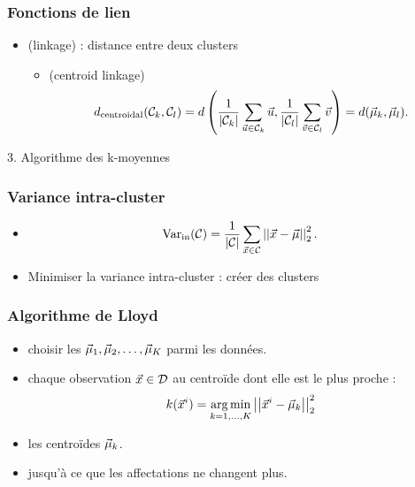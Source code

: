 \begin{frame}[t]
  \frametitle{Fonctions de lien}
  \begin{itemize}
  \item {} \textcolor{gray!70}{(linkage)} : distance entre deux clusters
    \begin{itemize}
    \item {} \textcolor{gray!70}{(centroid linkage)}
      \[
        d_{\text{centroidal}}(\mathcal{C}_k, \mathcal{C}_l) = d \left (\frac1{\lvert \mathcal{C}_k \rvert} 
          \sum_{\vec{u} \in \mathcal{C}_k} \vec{u}, 
          \frac1{\lvert \mathcal{C}_l \rvert} \sum_{\vec{v} \in \mathcal{C}_l} \vec{v} \right) = 
        d(\vec{\mu}_k, \vec{\mu}_l).
      \]
    \end{itemize}
  \end{itemize}
\end{frame}


\begin{frame}
  \begin{center}
    \large{3. Algorithme des k-moyennes}
  \end{center}
\end{frame}

\begin{frame}
  \frametitle{Variance intra-cluster}
  \begin{itemize}
  \item {}
    \[
            \text{Var}_\text{in}(\mathcal{C}) = \frac1{\lvert \mathcal{C} \rvert} \sum_{\vec{x} \in \mathcal{C}}
      \left|\left|\vec{x} - \vec{\mu}\right|\right|_2^2.
    \]
  \item Minimiser la variance intra-cluster : créer des clusters 
  \end{itemize}
\end{frame}

\begin{frame}
  \frametitle{Algorithme de Lloyd}
  \begin{itemize}
  \item {} choisir les $\vec{\mu}_1, \vec{\mu}_2, \ldots, \vec{\mu}_K$ parmi les données. 
  \item {} chaque observation $\vec{x} \in \mathcal{D}$ au centroïde dont elle est le plus proche :
    \begin{equation*}
      k(\vec{x}^i) = \operatorname*{arg\,min}_{k=1, \ldots, K}\left|\left|\vec{x}^i - \vec{\mu}_k\right|\right|_2^2
    \end{equation*}
  \item {} les centroïdes $\vec{\mu}_k$. 
  \item {} jusqu'à ce que les affectations ne changent plus. 
  \end{itemize}
\end{frame}

